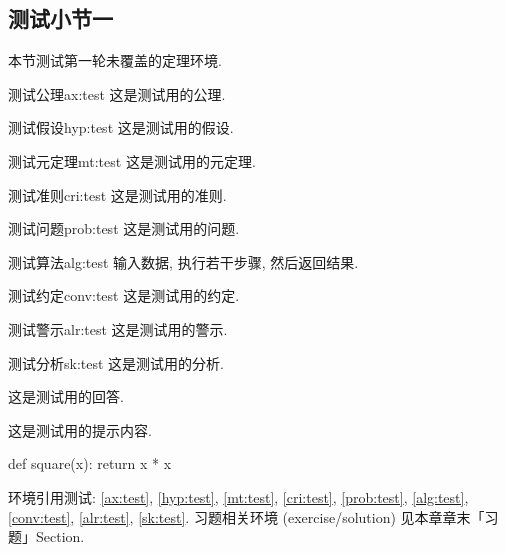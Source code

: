 \subsection{测试小节一}

本节测试第一轮未覆盖的定理环境.

\begin{axiom}{测试公理}{ax:test}
    这是测试用的公理.
\end{axiom}

\begin{hypothesis}{测试假设}{hyp:test}
    这是测试用的假设.
\end{hypothesis}

\begin{metatheorem}{测试元定理}{mt:test}
    这是测试用的元定理.
\end{metatheorem}

\begin{criteria}{测试准则}{cri:test}
    这是测试用的准则.
\end{criteria}

\begin{problem}{测试问题}{prob:test}
    这是测试用的问题.
\end{problem}

\begin{algorithm}{测试算法}{alg:test}
    输入数据, 执行若干步骤, 然后返回结果.
\end{algorithm}

\begin{convention}{测试约定}{conv:test}
    这是测试用的约定.
\end{convention}

\begin{alarm}{测试警示}{alr:test}
    这是测试用的警示.
\end{alarm}

\begin{sketch}{测试分析}{sk:test}
    这是测试用的分析.
\end{sketch}

\begin{answer}
    这是测试用的回答.
\end{answer}

\begin{hint}[测试提示]
    这是测试用的提示内容.
\end{hint}

\begin{code}[Python 测试]
def square(x):
    return x * x
\end{code}

环境引用测试: \autoref{ax:test}, \autoref{hyp:test}, \autoref{mt:test}, \autoref{cri:test}, \autoref{prob:test}, \autoref{alg:test}, \autoref{conv:test}, \autoref{alr:test}, \autoref{sk:test}.
习题相关环境 (exercise/solution) 见本章章末「习题」Section.
